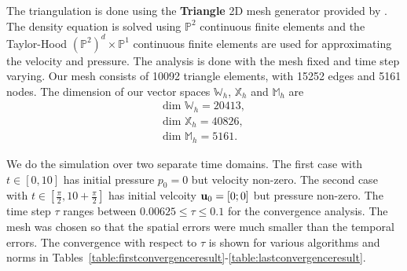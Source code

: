 \documentclass[letterpaper]{erdc}
\begin{document}
The triangulation is done using the \textbf{Triangle} 2D mesh generator provided by \cite{shewchuk1996triangle}.  The density equation is solved using $\mathbb{P}^2$ continuous finite elements and the Taylor-Hood $\left(\mathbb{P}^2\right)^d\times \mathbb{P}^1$ continuous finite elements are used for approximating the velocity and pressure.  The analysis is done with the mesh fixed and time step varying.  Our mesh consists of 10092 triangle elements, with 15252 edges and 5161 nodes.  The dimension of our vector spaces $\mathbb{W}_h$, $\mathbb{X}_h$ and $\mathbb{M}_h$ are
\begin{align}
  \mbox{dim }\mathbb{W}_h = 20413,\\
  \mbox{dim }\mathbb{X}_h = 40826,\\
  \mbox{dim }\mathbb{M}_h = 5161.
\end{align}

We do the simulation over two separate time domains.  The first case with $t\in[0,10]$ has initial pressure $p_0 = 0$ but velocity non-zero.  The second case with $t\in\left[\frac{\pi}{2}, 10+\frac{\pi}{2} \right]$ has initial velcoity $\textbf{u}_0 = [0; 0]$ but pressure non-zero.  The time step $\tau$ ranges between $0.00625\leq \tau \leq 0.1$ for the convergence analysis.  The mesh was chosen so that the spatial errors were much smaller than the temporal errors.  The convergence with respect to $\tau$ is shown for various algorithms and norms in Tables~\ref{table:firstconvergenceresult}-\ref{table:lastconvergenceresult}.


\newpage


%
%
\end{document}
